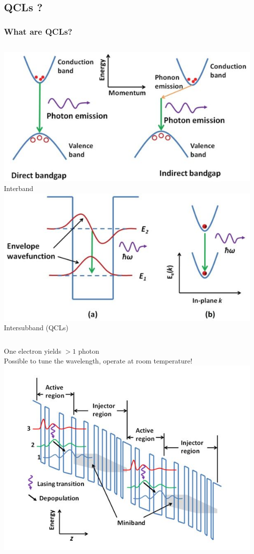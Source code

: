 \documentclass[14pt]{beamer}
\begin{document}
\subsection{QCLs ?}
\begin{frame}
\frametitle{What are QCLs?}
\begin{columns}[c]
\centering
\includegraphics[width=1.2\textwidth]{image1.jpg}\\
Interband
\centering
\includegraphics[width=1.2\textwidth]{image18.jpg}\\
\alert{Intersubband} (QCLs)
\end{columns}
\begin{columns}[c]
One electron yields $>1$ photon\\
Possible to \alert{tune the wavelength}, operate at \alert{room temperature}!
\centering
\includegraphics[width=1.1\textwidth]{image21.jpg}

\end{columns}
\end{frame}
\end{document}
